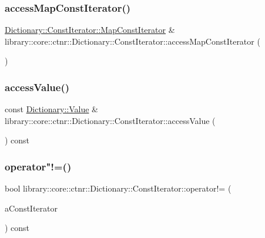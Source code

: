 \subsubsection{\texorpdfstring{accessMapConstIterator()}{accessMapConstIterator()}}
{\footnotesize\ttfamily \mbox{\hyperlink{classlibrary_1_1core_1_1ctnr_1_1_dictionary_1_1_const_iterator_a34426ebde79ee2bb93040f498f09b9ca}{Dictionary\+::\+Const\+Iterator\+::\+Map\+Const\+Iterator}} \& library\+::core\+::ctnr\+::\+Dictionary\+::\+Const\+Iterator\+::access\+Map\+Const\+Iterator (\begin{DoxyParamCaption}{ }\end{DoxyParamCaption})}

\mbox{\label{classlibrary_1_1core_1_1ctnr_1_1_dictionary_1_1_const_iterator_a65436be317af26f0c425a33f08f501b7}} 
\subsubsection{\texorpdfstring{accessValue()}{accessValue()}}
{\footnotesize\ttfamily const \mbox{\hyperlink{classlibrary_1_1core_1_1ctnr_1_1_dictionary_a3baf6692694e4fc27cb399ac083c88ea}{Dictionary\+::\+Value}} \& library\+::core\+::ctnr\+::\+Dictionary\+::\+Const\+Iterator\+::access\+Value (\begin{DoxyParamCaption}{ }\end{DoxyParamCaption}) const}

\mbox{\label{classlibrary_1_1core_1_1ctnr_1_1_dictionary_1_1_const_iterator_a213f81d2f8e661202d39aa6179fed459}} 
\subsubsection{\texorpdfstring{operator"!=()}{operator!=()}}
{\footnotesize\ttfamily bool library\+::core\+::ctnr\+::\+Dictionary\+::\+Const\+Iterator\+::operator!= (\begin{DoxyParamCaption}\item[{const \mbox{\hyperlink{classlibrary_1_1core_1_1ctnr_1_1_dictionary_1_1_const_iterator}{Const\+Iterator}} \&}]{a\+Const\+Iterator }\end{DoxyParamCaption}) const}

